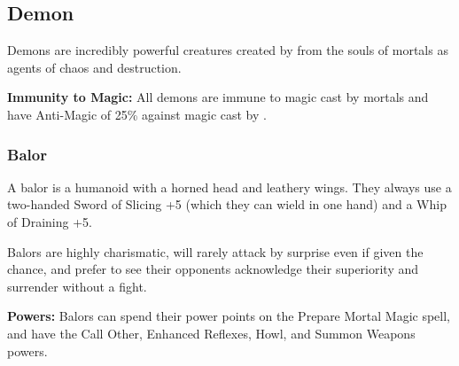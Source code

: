 \begin{multicols*}{2}
\subsection{Demon}
Demons are incredibly powerful creatures created by  from the souls of mortals as agents of chaos and destruction.

\textbf{Immunity to Magic:} All demons are immune to magic cast by mortals and have Anti-Magic of 25\% against magic cast by .

\subsubsection{Balor}

A balor is a humanoid with a horned head and leathery wings. They always use a two-handed Sword of Slicing +5 (which they can wield in one hand) and a Whip of Draining +5.

Balors are highly charismatic, will rarely attack by surprise even if given the chance, and prefer to see their opponents acknowledge their superiority and surrender without a fight.

\textbf{Powers:} Balors can spend their power points on the Prepare Mortal Magic spell, and have the Call Other, Enhanced Reflexes, Howl, and Summon Weapons powers.


\end{multicols*}
